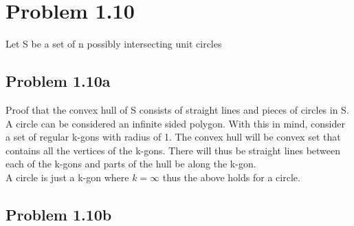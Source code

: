 \documentclass[11pt,psfig]{article}
\begin{document}
\section*{Problem 1.10}

Let S be a set of n possibly intersecting unit circles

\subsection*{Problem 1.10a}

Proof that the convex hull of S consists of straight lines and pieces of circles in S. 
\\
A circle can be considered an infinite sided polygon. With this in mind, consider a set of regular k-gons with radius of 1. The convex hull will be convex set that contains all the vertices of the k-gons. There will thus be straight lines between each of the k-gons and parts of the hull be along the k-gon. 
\\
A circle is just a k-gon where $k=\infty$ thus the above holds for a circle. 

\subsection*{Problem 1.10b}
\end{document}
